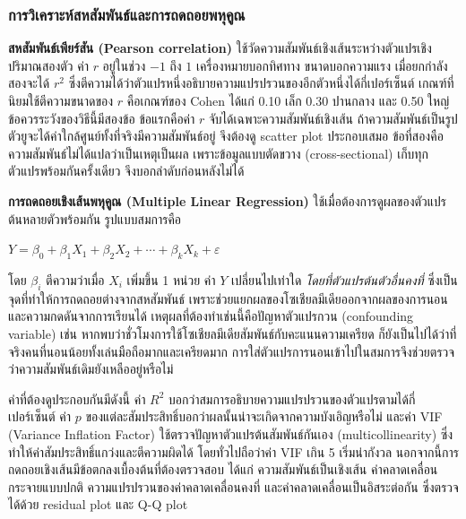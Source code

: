 \subsubsection*{การวิเคราะห์สหสัมพันธ์และการถดถอยพหุคูณ}

\textbf{สหสัมพันธ์เพียร์สัน (Pearson correlation)} ใช้วัดความสัมพันธ์เชิงเส้นระหว่างตัวแปรเชิงปริมาณสองตัว
ค่า $r$ อยู่ในช่วง $-1$ ถึง $1$ เครื่องหมายบอกทิศทาง ขนาดบอกความแรง
เมื่อยกกำลังสองจะได้ $r^2$ ซึ่งตีความได้ว่าตัวแปรหนึ่งอธิบายความแปรปรวนของอีกตัวหนึ่งได้กี่เปอร์เซ็นต์
เกณฑ์ที่นิยมใช้ตีความขนาดของ $r$ คือเกณฑ์ของ Cohen \cite{cohen1988statistical}
ได้แก่ 0.10 เล็ก 0.30 ปานกลาง และ 0.50 ใหญ่
ข้อควรระวังของวิธีนี้มีสองข้อ ข้อแรกคือค่า $r$ จับได้เฉพาะความสัมพันธ์เชิงเส้น
ถ้าความสัมพันธ์เป็นรูปตัวยูจะได้ค่าใกล้ศูนย์ทั้งที่จริงมีความสัมพันธ์อยู่ จึงต้องดู scatter plot ประกอบเสมอ
ข้อที่สองคือความสัมพันธ์ไม่ได้แปลว่าเป็นเหตุเป็นผล
เพราะข้อมูลแบบตัดขวาง (cross-sectional) เก็บทุกตัวแปรพร้อมกันครั้งเดียว จึงบอกลำดับก่อนหลังไม่ได้

\textbf{การถดถอยเชิงเส้นพหุคูณ (Multiple Linear Regression)} ใช้เมื่อต้องการดูผลของตัวแปรต้นหลายตัวพร้อมกัน
รูปแบบสมการคือ

\begin{center}
$Y = \beta_0 + \beta_1 X_1 + \beta_2 X_2 + \cdots + \beta_k X_k + \varepsilon$
\end{center}

\noindent
โดย $\beta_i$ ตีความว่าเมื่อ $X_i$ เพิ่มขึ้น 1 หน่วย ค่า $Y$ เปลี่ยนไปเท่าใด
\textit{โดยที่ตัวแปรต้นตัวอื่นคงที่} ซึ่งเป็นจุดที่ทำให้การถดถอยต่างจากสหสัมพันธ์
เพราะช่วยแยกผลของโซเชียลมีเดียออกจากผลของการนอนและความกดดันจากการเรียนได้
เหตุผลที่ต้องทำเช่นนี้คือปัญหาตัวแปรกวน (confounding variable)
เช่น หากพบว่าชั่วโมงการใช้โซเชียลมีเดียสัมพันธ์กับคะแนนความเครียด
ก็ยังเป็นไปได้ว่าที่จริงคนที่นอนน้อยทั้งเล่นมือถือมากและเครียดมาก
การใส่ตัวแปรการนอนเข้าไปในสมการจึงช่วยตรวจว่าความสัมพันธ์เดิมยังเหลืออยู่หรือไม่

ค่าที่ต้องดูประกอบกันมีดังนี้ ค่า $R^2$ บอกว่าสมการอธิบายความแปรปรวนของตัวแปรตามได้กี่เปอร์เซ็นต์
ค่า $p$ ของแต่ละสัมประสิทธิ์บอกว่าผลนั้นน่าจะเกิดจากความบังเอิญหรือไม่
และค่า VIF (Variance Inflation Factor) ใช้ตรวจปัญหาตัวแปรต้นสัมพันธ์กันเอง (multicollinearity)
ซึ่งทำให้ค่าสัมประสิทธิ์แกว่งและตีความผิดได้ โดยทั่วไปถือว่าค่า VIF เกิน 5 เริ่มน่ากังวล
นอกจากนี้การถดถอยเชิงเส้นมีข้อตกลงเบื้องต้นที่ต้องตรวจสอบ ได้แก่ ความสัมพันธ์เป็นเชิงเส้น
ค่าคลาดเคลื่อนกระจายแบบปกติ ความแปรปรวนของค่าคลาดเคลื่อนคงที่ และค่าคลาดเคลื่อนเป็นอิสระต่อกัน
ซึ่งตรวจได้ด้วย residual plot และ Q-Q plot

